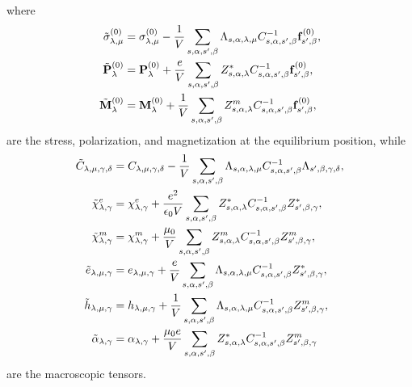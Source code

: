 \documentclass[12pt,a4paper]{article}
\begin{document}
where 
\begin{align}
\tilde \sigma^{(0)}_{\lambda,\mu}&= \sigma^{(0)}_{\lambda,\mu}
-{1\over V} \sum_{s,\alpha,s',\beta} \Lambda_{s,\alpha,\lambda,\mu}
C^{-1}_{s,\alpha,s',\beta} {\bf f}^{(0)}_{s',\beta}, \\
\tilde {\bf P}^{(0)}_\lambda&= {\bf P}^{(0)}_\lambda +{e\over V}
\sum_{s,\alpha,s',\beta} Z^*_{s,\alpha,\lambda} C^{-1}_{s,\alpha,s',\beta}
{\bf f}^{(0)}_{s',\beta}, \\
\tilde {\bf M}^{(0)}_\lambda&= {\bf M}^{(0)}_\lambda +{1\over V}
\sum_{s,\alpha,s',\beta} Z^m_{s,\alpha,\lambda} C^{-1}_{s,\alpha,s',\beta}
{\bf f}^{(0)}_{s',\beta},
\end{align}
are the stress, polarization, and magnetization at the equilibrium position,
while
\begin{align}
\tilde C_{\lambda,\mu,\gamma,\delta}&= C_{\lambda,\mu,\gamma,\delta}
-{1\over V}\sum_{s,\alpha,s',\beta} \Lambda_{s,\alpha,\lambda,\mu}
C^{-1}_{s,\alpha,s',\beta}  \Lambda_{s',\beta,\gamma,\delta},\\
\tilde \chi^e_{\lambda,\gamma}&= \chi^e_{\lambda,\gamma} 
+{e^2 \over \epsilon_0 V} \sum_{s,\alpha,s',\beta} Z^*_{s,\alpha,\lambda}
C^{-1}_{s,\alpha,s',\beta}  Z^*_{s',\beta,\gamma},\\
\tilde \chi^m_{\lambda,\gamma}&= \chi^m_{\lambda,\gamma} 
+{\mu_0 \over V} \sum_{s,\alpha,s',\beta} Z^m_{s,\alpha,\lambda}
C^{-1}_{s,\alpha,s',\beta}  Z^m_{s',\beta,\gamma}, \\
\tilde e_{\lambda,\mu,\gamma}&= e_{\lambda,\mu,\gamma}
+{e\over V}\sum_{s,\alpha,s',\beta} \Lambda_{s,\alpha,\lambda,\mu}
C^{-1}_{s,\alpha,s',\beta} Z^*_{s',\beta,\gamma}
,\\
\tilde h_{\lambda,\mu,\gamma}&= h_{\lambda,\mu,\gamma}
+{1\over V}\sum_{s,\alpha,s',\beta} \Lambda_{s,\alpha,\lambda,\mu}
C^{-1}_{s,\alpha,s',\beta} Z^m_{s',\beta,\gamma},\\
\tilde \alpha_{\lambda,\gamma}&= \alpha_{\lambda,\gamma}
+{\mu_0 e \over V}\sum_{s,\alpha,s',\beta} Z^*_{s,\alpha,\lambda}
C^{-1}_{s,\alpha,s',\beta}  Z^m_{s',\beta,\gamma}
\end{align}
are the macroscopic tensors.
\\
\end{document}
